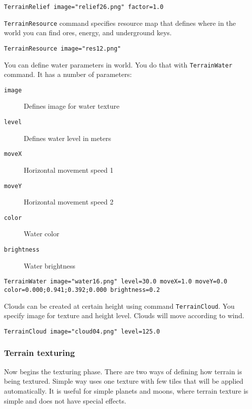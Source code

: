 \begin{lstlisting}[style=scene]
TerrainRelief image="relief26.png" factor=1.0
\end{lstlisting}

\texttt{TerrainResource} command specifies resource map that defines where in the world you can find ores, energy, and underground keys.

\begin{lstlisting}[style=scene]
TerrainResource image="res12.png"
\end{lstlisting}

You can define water parameters in world. You do that with \texttt{TerrainWater} command. It has a number of parameters:

\begin{description}
    \item[\texttt{image}] Defines image for water texture
    \item[\texttt{level}] Defines water level in meters
    \item[\texttt{moveX}] Horizontal movement speed 1
    \item[\texttt{moveY}] Horizontal movement speed 2
    \item[\texttt{color}] Water color
    \item[\texttt{brightness}] Water brightness
\end{description}


\begin{lstlisting}[style=scene]
TerrainWater image="water16.png" level=30.0 moveX=1.0 moveY=0.0 color=0.000;0.941;0.392;0.000 brightness=0.2
\end{lstlisting}

Clouds can be created at certain height using command \texttt{TerrainCloud}. You specify image for texture and height level. Clouds will move according to wind.

\begin{lstlisting}[style=scene]
TerrainCloud image="cloud04.png" level=125.0
\end{lstlisting}


\subsubsection{Terrain texturing}

Now begins the texturing phase. There are two ways of defining how terrain is being textured. Simple way uses one texture with few tiles that will be applied automatically. It is useful for simple planets and moons, where terrain texture is simple and does not have special effects.


